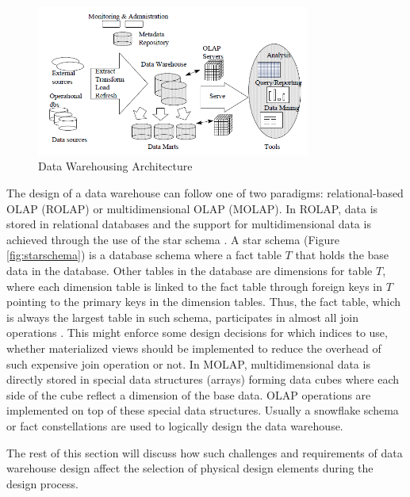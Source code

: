 \documentclass[12pt,a4paper]{article}
\begin{document}
\begin{figure}[!t]
\centering
\includegraphics[width=9cm]{figs/dw.png}
\caption{Data Warehousing Architecture \cite{chaudhuri1997overview}}
\label{fig:dw}
\end{figure}

The design of a data warehouse can follow one of two paradigms: relational-based OLAP (ROLAP) or multidimensional OLAP (MOLAP). In ROLAP, data is stored in
relational databases and the support for multidimensional data is achieved through the use of the star schema \cite{cheung2001towards}. A star schema (Figure
\ref{fig:starschema}) is a database schema where a fact table $T$ that holds the base data in the database. Other tables in the database are dimensions for
table $T$, where each dimension table is linked to the fact table through foreign keys in $T$ pointing to the primary keys in the dimension tables. Thus, the
fact table, which is always the largest table in such schema, participates in almost all join operations \cite{datta2002parallel}. This might enforce some
design decisions for which indices to use, whether materialized views should be implemented to reduce the overhead of such expensive join operation or not. In
MOLAP, multidimensional data is directly stored in special data structures (arrays) forming data cubes where each side of the cube reflect a dimension of the
base data. OLAP operations are implemented on top of these special data structures. Usually a snowflake schema \cite{kimball2009data} or fact constellations are
used to logically design the data warehouse.

The rest of this section will discuss how such challenges and requirements of data warehouse design affect the selection of physical design elements during the
design process.
\end{document}
